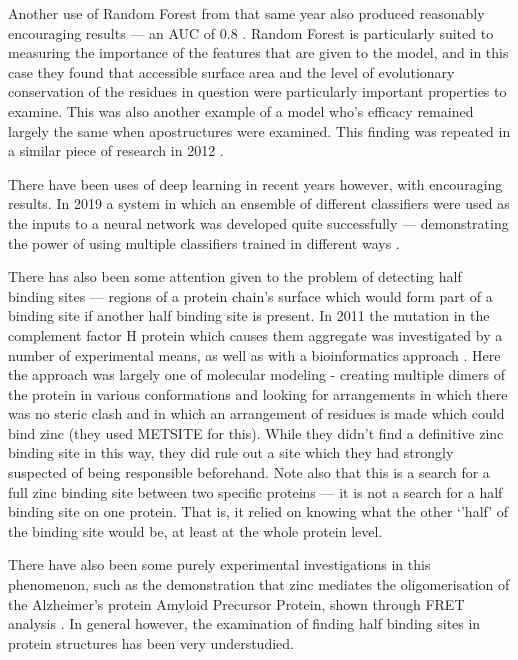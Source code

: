 Another use of Random Forest from that same year also produced reasonably encouraging results --- an AUC of 0.8 \cite{bordner2008}. Random Forest is particularly suited to measuring the importance of the features that are given to the model, and in this case they found that accessible surface area and the level of evolutionary conservation of the residues in question were particularly important properties to examine. This was also another example of a model who's efficacy remained largely the same when apostructures were examined. This finding was repeated in a similar piece of research in 2012 \cite{zheng2012}.

There have been uses of deep learning in recent years however, with encouraging results. In 2019 a system in which an ensemble of different classifiers were used as the inputs to a neural network was developed quite successfully --- demonstrating the power of using multiple classifiers trained in different ways \cite{li2019}.


There has also been some attention given to the problem of detecting half binding sites --- regions of a protein chain's surface which would form part of a binding site if another half binding site is present. In 2011 the mutation in the complement factor H protein which causes them aggregate was investigated by a number of experimental means, as well as with a bioinformatics approach \cite{nan2011zinc}. Here the approach was largely one of molecular modeling - creating multiple dimers of the protein in various conformations and looking for arrangements in which there was no steric clash and in which an arrangement of residues is made which could bind zinc (they used METSITE for this). While they didn't find a definitive zinc binding site in this way, they did rule out a site which they had strongly suspected of being responsible beforehand. Note also that this is a search for a full zinc binding site between two specific proteins --- it is not a search for a half binding site on one protein. That is, it relied on knowing what the other `'half' of the binding site would be, at least at the whole protein level.

There have also been some purely experimental investigations in this phenomenon, such as the demonstration that zinc mediates the oligomerisation of the Alzheimer's protein Amyloid Precursor Protein, shown through FRET analysis \cite{mayer2014novel}. In general however, the examination of finding half binding sites in protein structures has been very understudied.

